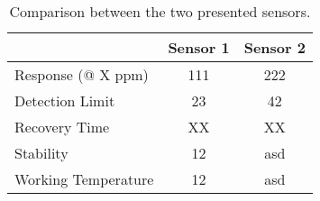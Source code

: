 \begin{table}[]
\centering
\begin{tabular}{lcc}
                    & Sensor 1 & Sensor 2 \\
                    \hline \hline
Response  (@ X ppm)          &   111       &   222       \\
\hline
Detection Limit     &    23      &   42       \\
\hline
Recovery Time       &      XX   &  XX        \\
\hline
Stability           &      12    &    asd      \\
\hline
Working Temperature &      12    &  asd       \\
\hline \hline
\end{tabular}
\caption{Comparison between the two presented sensors. }
\label{tab:comparison}
\end{table}